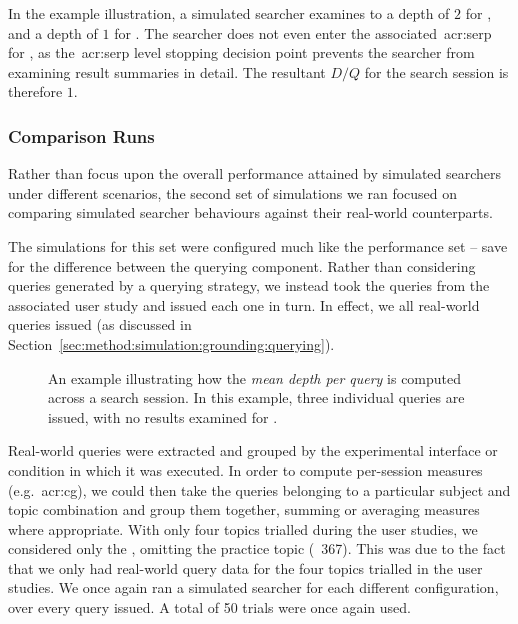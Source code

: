 In the example illustration, a simulated searcher examines to a depth of $2$ for , and a depth of $1$ for . The searcher does not even enter the associated~\gls{acr:serp} for , as the~\gls{acr:serp} level stopping decision point prevents the searcher from examining result summaries in detail. The resultant $D/Q$ for the search session is therefore $1$.

\vspace*{-4mm}
\subsubsection{Comparison Runs}\label{sec:method:simulation:runs:comparison}
Rather than focus upon the overall performance attained by simulated searchers under different scenarios, the second set of simulations we ran focused on comparing simulated searcher behaviours against their real-world counterparts.

The simulations for this set were configured much like the performance set -- save for the difference between the querying component. Rather than considering queries generated by a querying strategy, we instead took the queries from the associated user study and issued each one in turn. In effect, we  all real-world queries issued (as discussed in Section~\ref{sec:method:simulation:grounding:querying}).

\begin{figure}[t!]
    \centering
    \caption[Example depth per query computation]{An example illustrating how the \emph{mean depth per query} is computed across a search session. In this example, three individual queries are issued, with no results examined for .}
    \label{fig:depth_per_query}
\end{figure}

Real-world queries were extracted and grouped by the experimental interface or condition in which it was executed. In order to compute per-session measures (e.g.~\gls{acr:cg}), we could then take the queries belonging to a particular subject and topic combination and group them together, summing or averaging measures where appropriate. With only four topics trialled during the user studies, we considered only the , omitting the practice topic (\textnumero~367). This was due to the fact that we only had real-world query data for the four topics trialled in the user studies. We once again ran a simulated searcher for each different configuration, over every query issued. A total of 50 trials were once again used.

